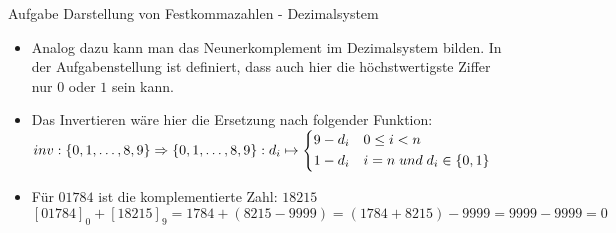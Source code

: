 \begin{frame}[allowframebreaks]{Aufgabe \thesection}{Darstellung von Festkommazahlen - Dezimalsystem}
\begin{solutionnoinc}
\begin{itemize}
invertiert.
      \item Analog dazu kann man das Neunerkomplement im Dezimalsystem bilden. In der Aufgabenstellung ist definiert, dass auch hier die höchstwertigste Ziffer nur $0$ oder $1$ sein kann. 
      \item Das Invertieren wäre hier die Ersetzung nach folgender Funktion:\\[0.25cm] $inv : \{0, 1, \ldots, 8, 9\} \Rightarrow \{0, 1, \ldots, 8, 9\} : d_i \mapsto \begin{dcases}
          9-d_i & 0\le i < n \\
          1-d_i & i = n\;und\;d_i\in\{0, 1\}
        \end{dcases}
        $
      \item Für $01784$ ist die komplementierte Zahl: $18215$\\[0.25cm]
        $[01784]_{0}+[18215]_{9}=1784+(8215-9999)=(1784+8215)-9999=9999-9999=0$
    \end{itemize}
  \end{solutionnoinc}
\end{frame}
